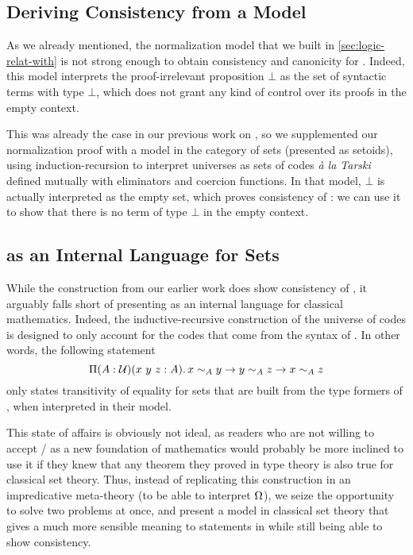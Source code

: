 \subsection{Deriving Consistency from a Model}

As we already mentioned, the normalization model that we built in
\cref{sec:logic-relat-with} is not strong enough to obtain consistency
and canonicity for \SetoidCC. Indeed, this model interprets the
proof-irrelevant proposition \( \bot \) as the set of syntactic
terms with type \( \bot \), which does not grant any kind of control
over its proofs in the empty context.

This was already the case in our previous work on \SetoidTT {}, 
so we supplemented our normalization proof with a model
in the category of sets (presented as setoids), using
induction-recursion to interpret universes as sets of codes \textit{à
  la Tarski} defined mutually with eliminators and coercion functions.
%
In that model, \( \bot \) is actually interpreted as the empty set, which
proves consistency of \SetoidTT: we can use it to show that there is
no term of type \( \bot \) in the empty context.

\subsection{\SetoidCC as an Internal Language for Sets}

While the construction from our earlier work \cite{pujet:hal-03367052} does 
show consistency of \SetoidTT, it arguably falls short of presenting \SetoidTT 
as an internal language for classical mathematics.
%
Indeed, the inductive-recursive construction of the universe of codes is
designed to only account for the codes that come from the syntax of
\SetoidTT. In other words, the following statement
\[
\Pi(A : \Type)(x\ y\ z : A).\,\Fun{\Fun{\Obseq[A]{x}{y}}{\Obseq[A]{y}{z}}}{\Obseq[A]{x}{z}}
\]
only states transitivity of equality for sets that are built from
the type formers of \SetoidTT, when interpreted in their model.

This state of affairs is obviously not ideal, as readers who are not
willing to accept \SetoidTT / \SetoidCC as a new foundation of mathematics would
probably be more inclined to use it if they knew that any theorem they
proved in type theory is also true for classical set theory.
%
Thus, instead of replicating this construction in an impredicative
meta-theory (to be able to interpret \( \sProp \)), we seize the
opportunity to solve two problems at once, and present a model in classical
set theory that gives a much more sensible meaning to statements in \SetoidCC
while still being able to show consistency.

